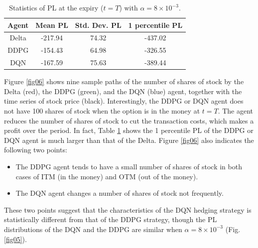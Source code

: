 \documentclass[11pt]{article}
\begin{document}
\begin{table}[htb]
	\begin{center}
	\begin{tabular}{| c | c | c | c |} \hline
            Agent & Mean PL & Std. Dev. PL & 1 percentile PL \\ \hline\hline
            Delta & -217.94 & 74.32 & -437.02 \\  \hline
            DDPG & -154.43 & 64.98 & -326.55 \\  \hline
            DQN & -167.59 &  75.63 & -389.44 \\ \hline
        \end{tabular}
        \caption{Statistics of PL at the expiry ($t=T$) with $\alpha = 8 \times 10^{-3}$.}
        \label{Table4}
        \end{center}
\end{table}

Figure \ref{fig06} shows nine sample paths of the number of shares of stock by the Delta (red), the DDPG (green), and the DQN (blue) agent, together with the time series of stock price (black). Interestingly, the DDPG or DQN agent does not have 100 shares of stock when the option is in the money at $t=T$. The agent reduces the number of shares of stock to cut the transaction costs, which makes a profit over the period. In fact, Table \ref{Table4} shows the 1 percentile PL of the DDPG or DQN agent is much larger than that of the Delta. Figure \ref{fig06} also indicates the following two points:
%
\begin{itemize}
	\item The DDPG agent tends to have a small number of shares of stock in both cases of ITM (in the money) and OTM (out of the money).
	\item The DQN agent changes a number of shares of stock not frequently.
\end{itemize}
%
These two points suggest that the characteristics of the DQN hedging strategy is statistically different from that of the DDPG strategy, though the PL distributions of the DQN and the DDPG are similar when $\alpha = 8 \times 10^{-3}$ (Fig. \ref{fig05}).
\end{document}
